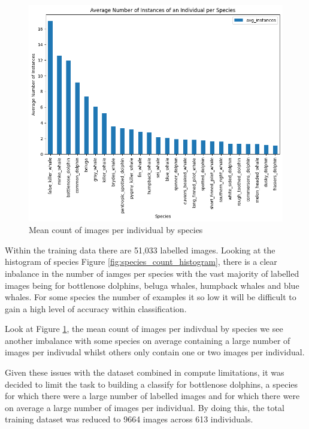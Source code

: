 \documentclass{article}
\begin{document}
\begin{figure}
    \includegraphics[width=\linewidth]{mean_individuals_histogram.png}
    \caption{Mean count of images per individual by species}
    \label{fig:individual_mean_count_histogram}
\end{figure}

Within the training data there are 51,033 labelled images. Looking at the histogram of species Figure \ref{fig:species_count_histogram}, there is a clear inbalance in the number of iamges per species with the vast majority
of labelled images being for bottlenose dolphins, beluga whales, humpback whales and blue whales. For some species the number of examples it so low it will be difficult to gain a high level of accuracy within classification.

Look at Figure \ref{fig:individual_mean_count_histogram}, the mean count of images per indivdual by species we see another imbalance with some species on average containing a large number of images per indivudal whilst others only contain one or two images per individual.

Given these issues with the dataset combined in compute limitations, it was decided to limit the task to building a classify for bottlenose dolphins, a species for which there were a large number of labelled images and for which there 
were on average a large number of images per individual. By doing this, the total training dataset was reduced to 9664 images across 613 individuals.
\end{document}
